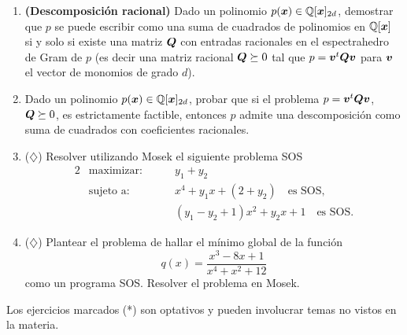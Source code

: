 \documentclass[11pt]{article}
\begin{document}
\begin{enumerate}
\item \textbf{(Descomposición racional)} Dado un polinomio $p(\bm{x}) \in \mathbb{Q}[\bm{x}]_{2d}$, demostrar que $p$ se puede escribir como una suma de cuadrados de polinomios en $\mathbb{Q}[\bm{x}]$ si y solo si existe una matriz $\bm{Q}$ con entradas racionales en el espectrahedro de Gram de $p$ (es decir una matriz racional $\bm{Q} \succeq 0$ tal que $p = \bm{v}^t \bm{Q} \bm{v}$ para $\bm{v}$ el vector de monomios de grado $d$).
    
\item Dado un polinomio $p(\bm{x}) \in \mathbb{Q}[\bm{x}]_{2d}$, probar que si el problema $p = \bm{v}^t \bm{Q} \bm{v}$, $\bm{Q} \succeq 0$, es estrictamente factible, entonces $p$ admite una descomposición como suma de cuadrados con coeficientes racionales.


\item ($\diamondsuit$) Resolver utilizando Mosek el siguiente problema SOS
\begin{alignat*}{2}
  & \text{maximizar: } & & y_1 + y_2  \\
  & \text{sujeto a: } & \quad & x^4 + y_1 x + (2 + y_2) \quad \text{es SOS,} \\
  &  & \quad & (y_1 - y_2 + 1)x^2 + y_2 x + 1 \quad  \text{es SOS.}
\end{alignat*}

\item ($\diamondsuit$) Plantear el problema de hallar el mínimo global de la función
$$
q(x) = \frac{x^3 - 8x + 1}{x^4 + x^2 + 12}
$$
como un programa SOS. Resolver el problema en Mosek.

    
    
    

\end{enumerate}



Los ejercicios marcados (*) son optativos y pueden involucrar temas no vistos en la materia.
\end{document}
